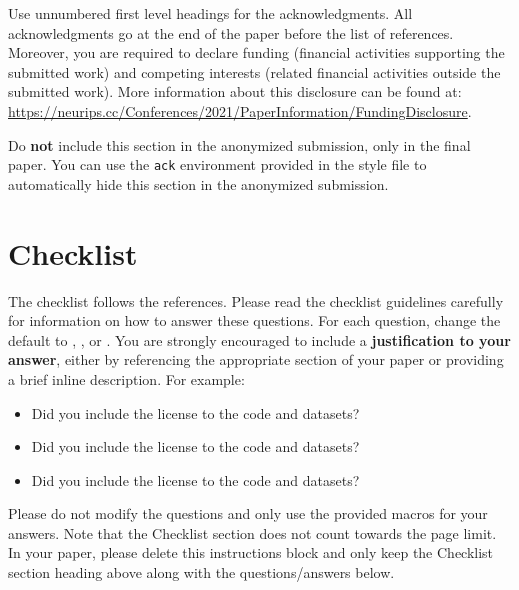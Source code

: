 \documentclass{article}
\begin{document}
\begin{ack}
Use unnumbered first level headings for the acknowledgments. All acknowledgments
go at the end of the paper before the list of references. Moreover, you are required to declare
funding (financial activities supporting the submitted work) and competing interests (related financial activities outside the submitted work).
More information about this disclosure can be found at: \url{https://neurips.cc/Conferences/2021/PaperInformation/FundingDisclosure}.

Do {\bf not} include this section in the anonymized submission, only in the final paper. You can use the \texttt{ack} environment provided in the style file to automatically hide this section in the anonymized submission.
\end{ack}



\section*{Checklist}

The checklist follows the references.  Please
read the checklist guidelines carefully for information on how to answer these
questions.  For each question, change the default \answerTODO{} to \answerYes{},
\answerNo{}, or \answerNA{}.  You are strongly encouraged to include a {\bf
justification to your answer}, either by referencing the appropriate section of
your paper or providing a brief inline description.  For example:
\begin{itemize}
  \item Did you include the license to the code and datasets? 
  \item Did you include the license to the code and datasets? 
  \item Did you include the license to the code and datasets? \answerNA{}
\end{itemize}
Please do not modify the questions and only use the provided macros for your
answers.  Note that the Checklist section does not count towards the page
limit.  In your paper, please delete this instructions block and only keep the
Checklist section heading above along with the questions/answers below.
\end{document}
